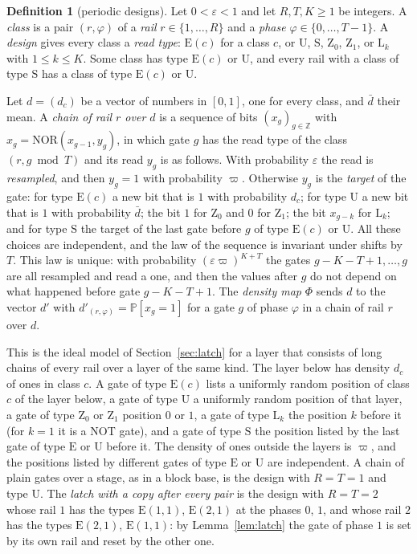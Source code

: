 \documentclass[11pt]{amsart}
\theoremstyle{definition}
\newtheorem{definition}[theorem]{Definition}
\theoremstyle{remark}
\newcommand{\eps}{\varepsilon}
\newcommand{\NOR}{\mathrm{NOR}}
\newcommand{\PP}{\mathbb{P}}
\begin{document}
\begin{definition}[periodic designs]\label{def:design}
Let $0<\eps<1$ and let $R,T,K\ge1$ be integers. A \emph{class} is a pair $(r,\varphi)$ of a \emph{rail}
$r\in\{1,\dots,R\}$ and a \emph{phase} $\varphi\in\{0,\dots,T-1\}$. A \emph{design} gives every class a
\emph{read type}: $\mathrm E(c)$ for a class $c$, or $\mathrm U$, $\mathrm S$, $\mathrm Z_0$,
$\mathrm Z_1$, or $\mathrm L_k$ with $1\le k\le K$. Some class has type $\mathrm E(c)$ or
$\mathrm U$, and every rail with a class of type $\mathrm S$ has a class of type $\mathrm E(c)$ or
$\mathrm U$.

Let $d=(d_c)$ be a vector of numbers in $[0,1]$, one for every class, and $\bar d$ their mean. A
\emph{chain of rail $r$ over $d$} is a sequence of bits $(x_g)_{g\in\mathbb Z}$ with
$x_g=\NOR(x_{g-1},y_g)$, in which gate $g$ has the read type of the class $(r,g\bmod T)$ and its
read $y_g$ is as follows. With probability $\eps$ the read is \emph{resampled}, and then $y_g=1$
with probability $\varpi$. Otherwise $y_g$ is the \emph{target} of the gate: for type
$\mathrm E(c)$ a new bit that is $1$ with probability $d_c$; for type $\mathrm U$ a new bit that
is $1$ with probability $\bar d$; the bit $1$ for $\mathrm Z_0$ and $0$ for $\mathrm Z_1$; the bit
$x_{g-k}$ for $\mathrm L_k$; and for type $\mathrm S$ the target of the last gate before $g$ of
type $\mathrm E(c)$ or $\mathrm U$. All these choices are independent, and the law of the
sequence is invariant under shifts by $T$. This law is unique: with probability $(\eps\varpi)^{K+T}$ the gates $g-K-T+1,\dots,g$ are all resampled and
read a one, and then the values after $g$ do not depend on what happened before gate $g-K-T+1$.
The \emph{density map} $\Phi$ sends $d$ to the vector $d'$ with $d'_{(r,\varphi)}=\PP[x_g=1]$ for a
gate $g$ of phase $\varphi$ in a chain of rail $r$ over $d$.
\end{definition}

\noindent This is the ideal model of Section~\ref{sec:latch} for a layer that consists of long chains of
every rail over a layer of the same kind. The layer below has density $d_c$ of ones in class $c$.
A gate of type $\mathrm E(c)$ lists a uniformly random position of class $c$ of the layer below,
a gate of type $\mathrm U$ a uniformly random position of that layer, a gate of type
$\mathrm Z_0$ or $\mathrm Z_1$ position $0$ or $1$, a gate of type $\mathrm L_k$ the position $k$
before it (for $k=1$ it is a NOT gate), and a gate of type $\mathrm S$ the position listed by the
last gate of type $\mathrm E$ or $\mathrm U$ before it. The density of ones outside the layers is
$\varpi$, and the positions listed by different gates of type $\mathrm E$ or $\mathrm U$ are
independent. A chain of plain gates over a stage, as in a block base, is the design with $R=T=1$
and type $\mathrm U$. The \emph{latch with a copy after every pair} is the design with $R=T=2$
whose rail $1$ has the types $\mathrm E(1,1)$, $\mathrm E(2,1)$ at the phases $0$, $1$, and whose
rail $2$ has the types $\mathrm E(2,1)$, $\mathrm E(1,1)$: by Lemma~\ref{lem:latch} the gate of
phase $1$ is set by its own rail and reset by the other one.
\end{document}
